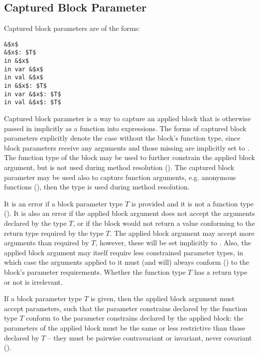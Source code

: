 \subsection{Captured Block Parameter}
\label{sec:captured-block-parameter}

Captured block parameters are of the forms:
\begin{lstlisting}
&$x$
&$x$: $T$
in &$x$
in var &$x$
in val &$x$
in &$x$: $T$
in var &$x$: $T$
in val &$x$: $T$
\end{lstlisting}

Captured block parameter is a way to capture an applied block that is otherwise passed in implicitly as a function into  expressions. The forms of captured block parameters explicitly denote the case without the block's function type, since block parameters receive any arguments and those missing are implicitly set to . The function type of the block may be used to further constrain the applied block argument, but is not used during method resolution (). The captured block parameter may be used also to capture function arguments, e.g. anonymous functions (), then the type is used during method resolution. 

It is an error if a block parameter type $T$ is provided and it is not a function type (). It is also an error if the applied block argument does not accept the arguments declared by the type $T$, or if the block would not return a value conforming to the return type required by the type $T$. The applied block argument may accept more arguments than required by $T$, however, these will be set implicitly to . Also, the applied block argument may itself require less constrained parameter types, in which case the arguments applied to it must (and will) always conform () to the block's parameter requirements. Whether the function type $T$ has a return type or not is irrelevant. 

If a block parameter type $T$ is given, then the applied block argument must accept parameters, such that the parameter constrains declared by the function type $T$ conform to the parameter constrains declared by the applied block: the parameters of the applied block must be the same or less restrictive than those declared by $T$ -- they must be pairwise contravariant or invariant, never covariant (). 






